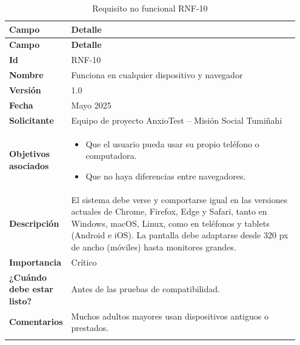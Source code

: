 \begin{longtable}{p{0.15\linewidth} p{0.80\linewidth}}
\toprule
\rowcolor{tableheader!20}
\textbf{Campo} & \textbf{Detalle} \\
\midrule
\endfirsthead
\rowcolor{tableheader!20}
\textbf{Campo} & \textbf{Detalle} \\
\midrule
\endhead
\bottomrule
\endfoot
\textbf{Id} & RNF-10 \\
\textbf{Nombre} & Funciona en cualquier dispositivo y navegador \\
\textbf{Versión} & 1.0 \\
\textbf{Fecha} & Mayo 2025 \\
\textbf{Solicitante} & Equipo de proyecto AnxioTest – Misión Social Tumiñahi \\
\textbf{Objetivos asociados} & 
  \begin{itemize}
    \item Que el usuario pueda usar su propio teléfono o computadora.
    \item Que no haya diferencias entre navegadores.
  \end{itemize} \\
\textbf{Descripción} & El sistema debe verse y comportarse igual en las versiones actuales de Chrome, Firefox, Edge y Safari, tanto en Windows, macOS, Linux, como en teléfonos y tablets (Android e iOS). La pantalla debe adaptarse desde 320 px de ancho (móviles) hasta monitores grandes. \\
\textbf{Importancia} & Crítico \\
\textbf{¿Cuándo debe estar listo?} & Antes de las pruebas de compatibilidad. \\
\textbf{Comentarios} & Muchos adultos mayores usan dispositivos antiguos o prestados. \\
\bottomrule
\caption{Requisito no funcional RNF-10}
\end{longtable}

